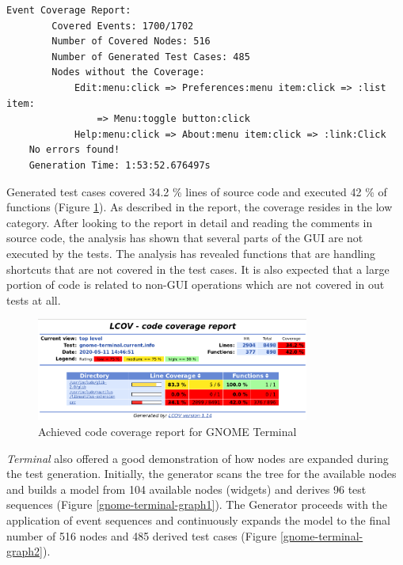\begin{lstlisting}[caption={Final test generator report for GNOME Terminal},label={gnome-terminal-report}]
    Event Coverage Report:
        Covered Events: 1700/1702
        Number of Covered Nodes: 516
        Number of Generated Test Cases: 485 
        Nodes without the Coverage:
            Edit:menu:click => Preferences:menu item:click => :list item: 
                => Menu:toggle button:click
            Help:menu:click => About:menu item:click => :link:Click
    No errors found!
    Generation Time: 1:53:52.676497s
\end{lstlisting}

Generated test cases covered 34.2 \% lines of source code and executed 42 \% of functions (Figure \ref{gnome-terminal-coverage}). As described in the report, the coverage resides in the low category. After looking to the report in detail and reading the comments in source code, the analysis has shown that several parts of the GUI are not executed by the tests. The analysis has revealed functions that are handling shortcuts that are not covered in the test cases. It is also expected that a large portion of code is related to non-GUI operations which are not covered in out tests at all.

\begin{figure}[H]
	\centering
	\includegraphics[width=0.8\textwidth,clip]{obrazky-figures/gnome-termina-coverage.png}
	\caption{Achieved code coverage report for GNOME Terminal}
	\label{gnome-terminal-coverage}
\end{figure}

\textit{Terminal} also offered a good demonstration of how nodes are expanded during the test generation. Initially, the generator scans the tree for the available nodes and builds a model from 104 available nodes (widgets) and derives 96 test sequences (Figure \ref{gnome-terminal-graph1}). The Generator proceeds with the application of event sequences and continuously expands the model to the final number of 516 nodes and 485 derived test cases (Figure \ref{gnome-terminal-graph2}).

